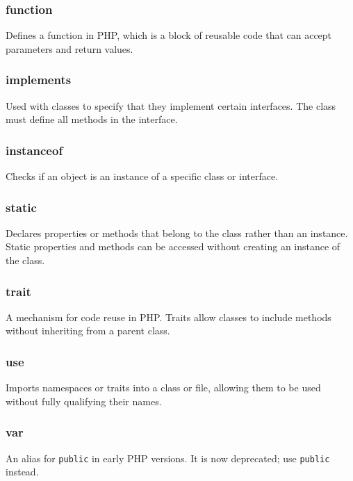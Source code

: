 \documentclass{report}
\begin{document}
\bigbreak \noindent 
\subsubsection{function}
\bigbreak \noindent 
Defines a function in PHP, which is a block of reusable code that can accept parameters and return values.

\bigbreak \noindent 
\subsubsection{implements}
\bigbreak \noindent 
Used with classes to specify that they implement certain interfaces. The class must define all methods in the interface.

\bigbreak \noindent 
\subsubsection{instanceof}
\bigbreak \noindent 
Checks if an object is an instance of a specific class or interface.

\bigbreak \noindent 
\subsubsection{static}
\bigbreak \noindent 
Declares properties or methods that belong to the class rather than an instance. Static properties and methods can be accessed without creating an instance of the class.

\bigbreak \noindent 
\subsubsection{trait}
\bigbreak \noindent 
A mechanism for code reuse in PHP. Traits allow classes to include methods without inheriting from a parent class.

\bigbreak \noindent 
\subsubsection{use}
\bigbreak \noindent 
Imports namespaces or traits into a class or file, allowing them to be used without fully qualifying their names.

\bigbreak \noindent 
\subsubsection{var}
\bigbreak \noindent 
An alias for \texttt{public} in early PHP versions. It is now deprecated; use \texttt{public} instead.
\end{document}
